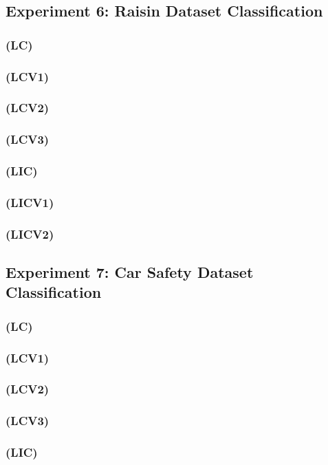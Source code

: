 \documentclass[a4paper, 12pt]{report}
\begin{document}
\subsection{Experiment 6: Raisin Dataset Classification}
\subsubsection{(LC)}
\subsubsection{(LCV1)}
\subsubsection{(LCV2)}
\subsubsection{(LCV3)}
\subsubsection{(LIC)}
\subsubsection{(LICV1)}
\subsubsection{(LICV2)}

\subsection{Experiment 7: Car Safety Dataset Classification}
\subsubsection{(LC)}
\subsubsection{(LCV1)}
\subsubsection{(LCV2)}
\subsubsection{(LCV3)}
\subsubsection{(LIC)}
\end{document}
